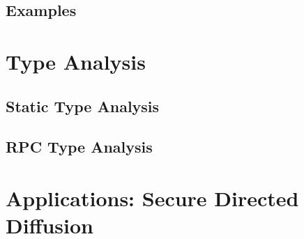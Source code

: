 \subsection{Examples}

\section{Type Analysis}

\subsection{Static Type Analysis}

\subsection{RPC Type Analysis}

\section{Applications: Secure Directed Diffusion}
